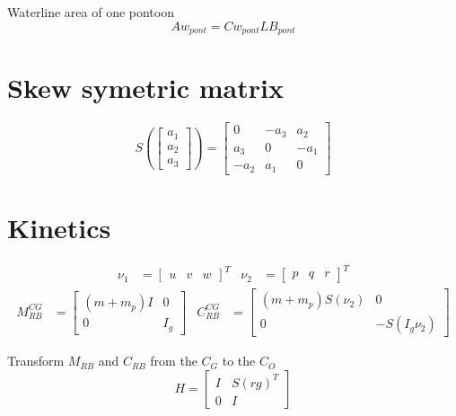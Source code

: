 \documentclass[12pt,a4]{article}
\begin{document}
Waterline area of one pontoon
\begin{equation}
	Aw_{pont} = Cw_{pont} L B_{pont}
\end{equation}

\section{Skew symetric matrix}

\begin{equation}
	S\left(\begin{bmatrix}a_1\\a_2\\a_3\end{bmatrix}\right) =
	\begin{bmatrix}
		0    & -a_3 & a_2  \\
		a_3  & 0    & -a_1 \\
		-a_2 & a_1  & 0
	\end{bmatrix}
\end{equation}


\section{Kinetics}
\begin{align}
	\nu_1 & = \begin{bmatrix}u & v & w\end{bmatrix}^T & \nu_2 & = \begin{bmatrix}p & q & r\end{bmatrix}^T
\end{align}
\begin{align}
	M_{RB}^{CG}               & =
	\begin{bmatrix}
		(m+m_p)I & 0   \\
		0        & I_g
	\end{bmatrix} &
	C_{RB}^{CG}               & =
	\begin{bmatrix}
		(m+m_p) S(\nu_2) & 0             \\
		0                & -S(I_g \nu_2)
	\end{bmatrix}
\end{align}



Transform $M_{RB}$ and $C_{RB}$ from the $C_G$ to the $C_O$
\begin{equation}
	H = \begin{bmatrix} I & S(rg)^T\\ 0  & I \end{bmatrix}
\end{equation}
\end{document}
